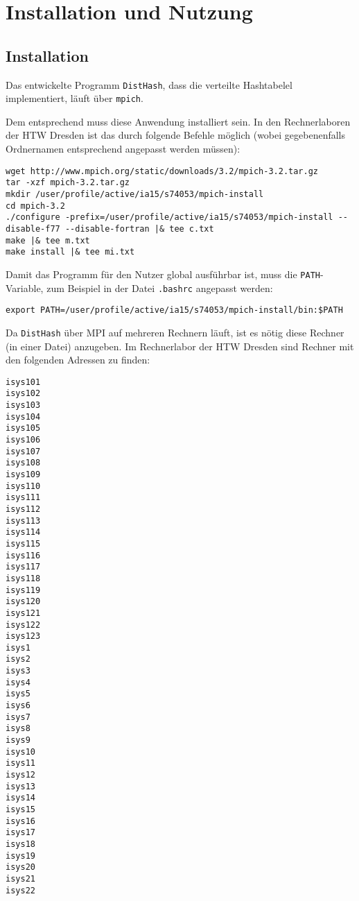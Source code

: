 \documentclass{scrreprt}
\begin{document}
\chapter{Installation und Nutzung}

\section{Installation}

Das entwickelte Programm \lstinline`DistHash`, dass die verteilte Hashtabelel implementiert, läuft über \lstinline`mpich`. 

Dem entsprechend muss diese Anwendung installiert sein. In den Rechnerlaboren der HTW Dresden ist das durch folgende Befehle möglich (wobei gegebenenfalls Ordnernamen entsprechend angepasst werden müssen):
\begin{lstlisting}
wget http://www.mpich.org/static/downloads/3.2/mpich-3.2.tar.gz
tar -xzf mpich-3.2.tar.gz
mkdir /user/profile/active/ia15/s74053/mpich-install
cd mpich-3.2
./configure -prefix=/user/profile/active/ia15/s74053/mpich-install --disable-f77 --disable-fortran |& tee c.txt
make |& tee m.txt
make install |& tee mi.txt
\end{lstlisting}
Damit das Programm für den Nutzer global ausführbar ist, muss die \lstinline`PATH`-Variable, zum Beispiel in der Datei \lstinline`.bashrc` angepasst werden:
\begin{lstlisting}
export PATH=/user/profile/active/ia15/s74053/mpich-install/bin:$PATH
\end{lstlisting}

Da \lstinline`DistHash` über MPI auf mehreren Rechnern läuft, ist es nötig diese Rechner (in einer Datei) anzugeben. Im Rechnerlabor der HTW Dresden sind Rechner mit den folgenden Adressen zu finden:%
\begin{multicols}{4}%
\begin{lstlisting}[numbers=none]
isys101
isys102
isys103
isys104
isys105
isys106
isys107
isys108
isys109
isys110
isys111
isys112
isys113
isys114
isys115
isys116
isys117
isys118
isys119
isys120
isys121
isys122
isys123
isys1
isys2
isys3
isys4
isys5
isys6
isys7
isys8
isys9
isys10
isys11
isys12
isys13
isys14
isys15
isys16
isys17
isys18
isys19
isys20
isys21
isys22
\end{lstlisting}
\end{multicols}
\end{document}
